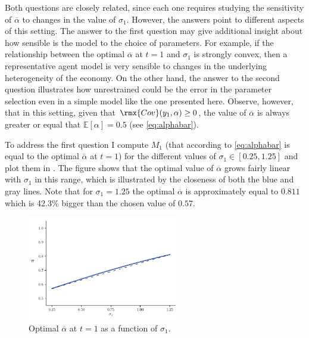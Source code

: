 \documentclass[english, a4paper,12pt]{article}
\begin{document}
Both questions are closely related, since each one requires studying the sensitivity of $\overline{\alpha}$ to changes in the value of $\sigma_{1}$. However, the answers point to different aspects of this setting. The answer to the first question may give additional insight about how sensible is the model to the choice of parameters. For example, if the relationship between the optimal $\overline{\alpha}$ at $t = 1$ and $\sigma_{1}$ is strongly convex, then a representative agent model is very sensible to changes in the underlying heterogeneity of the economy. On the other hand, the answer to the second question illustrates how unrestrained could be the error in the parameter selection even in a simple model like the one presented here. Observe, however, that in this setting, given that $\rmx{Cov}(y_{1},\alpha) \geq 0$, the value of $\overline{\alpha}$ is always greater or equal that $\mathbb{E}[\alpha] = 0.5$ (see \eqref{eq:alphabar}).

To address the first question I compute $M_{1}$ (that according to \eqref{eq:alphabar} is equal to the optimal $\overline{\alpha}$ at $t = 1$) for the different values of $\sigma_{1} \in [0.25, 1.25]$ and plot them in . The figure shows that the optimal value of $\overline{\alpha}$ grows fairly linear with $\sigma_{1}$ in this range, which is illustrated by the closeness of both the blue and gray lines. Note that for $\sigma_{1} = 1.25$ the optimal $\overline{\alpha}$ is approximately equal to $0.811$ which is 42.3\% bigger than the chosen value of $0.57$.
	\begin{figure}[H] 
		\caption{Optimal $\overline{\alpha}$ at $t = 1$ as a function of $\sigma_{1}$.}
		\label{fig:RAalphaDiff}
		\includegraphics[width = 0.6\textwidth]{RAdiffAlphasPlot}
	\end{figure}
	
\end{document}
